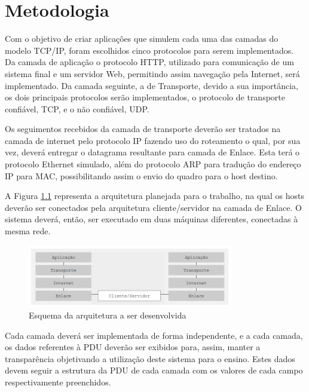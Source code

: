 
\chapter{Metodologia}
\label{chap:metodologia}
Com o objetivo de criar aplicações que simulem cada uma das camadas do modelo TCP/IP, foram escolhidos cinco protocolos para serem implementados. Da camada de aplicação o protocolo HTTP, utilizado para comunicação de um sistema final e um servidor Web, permitindo assim navegação pela Internet, será implementado. Da camada seguinte, a de Transporte, devido a sua importância, os dois principais protocolos serão implementados, o protocolo de transporte confiável, TCP, e o não confiável, UDP.
 
Os seguimentos recebidos da camada de transporte deverão ser tratados na camada de internet pelo protocolo IP fazendo uso do roteamento o qual, por sua vez, deverá entregar o datagrama resultante para camada de Enlace. Esta terá o protocolo Ethernet simulado, além do protocolo ARP para tradução do endereço IP para MAC, possibilitando assim o envio do quadro para o host destino.

A Figura \ref{fig:objetivo} representa a arquitetura planejada para o trabalho, na qual os hosts deverão ser conectados pela arquitetura cliente/servidor na camada de Enlace. O sistema deverá, então, ser executado em duas máquinas diferentes, conectadas à mesma rede.


\begin{figure}[H]
	\centering
    \includegraphics[width=0.80\textwidth]{04-figuras/objetivo.png}
    \caption{Esquema da arquitetura a ser desenvolvida}
    \label{fig:objetivo}
\end{figure}

Cada camada deverá ser implementada de forma independente, e a cada camada, os dados referentes à PDU deverão ser exibidos para, assim, manter a transparência objetivando a utilização deste sistema para o ensino. Estes dados devem seguir a estrutura da PDU de cada camada com os valores de cada campo respectivamente preenchidos.

